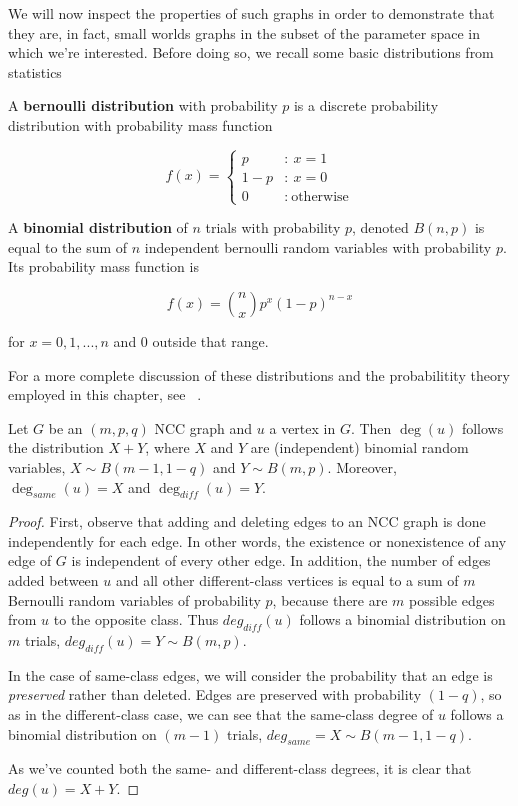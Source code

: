 We will now inspect the properties of such graphs in order to demonstrate that they are, in fact,
small worlds graphs in the subset of the parameter space in which we're interested. Before doing so,
we recall some basic distributions from statistics

\begin{definition}
  A \textbf{bernoulli distribution} with probability $p$ is a discrete probability distribution
  with probability mass function

  \[
    f(x) =
      \begin{cases}
        p &:~ x = 1 \\
        1-p &:~ x = 0 \\
        0 &:~ \text{otherwise}
      \end{cases}
    \]

  A \textbf{binomial distribution} of $n$ trials with probability $p$, denoted $B(n,p)$ is equal to
  the sum of $n$ independent bernoulli random variables with probability $p$. Its probability mass
  function is

  \[
    f(x) = {n \choose x} p^x(1-p)^{n-x}
  \]

  for $x = 0,1,...,n$ and $0$ outside that range.

  For a more complete discussion of these distributions and the probabilitity theory employed in
  this chapter, see ~\cite{CaseBerg:01}.
\end{definition}


\begin{theorem}
  \label{thm:ncc_deg}
  Let $G$ be an $(m,p,q)$ NCC graph and $u$ a vertex in $G$. Then $\deg(u)$ follows the distribution
  $X + Y$, where $X$ and $Y$ are (independent) binomial random variables, $X \sim B(m-1,1-q)$ and
  $Y \sim B(m,p)$. Moreover, $\deg_{same}(u) = X$ and $\deg_{diff}(u) = Y$.
\end{theorem}
\begin{proof}
  First, observe that adding and deleting edges to an NCC graph is done independently for each edge.
  In other words, the existence or nonexistence of any edge of $G$ is independent of every other edge.
  In addition, the number of edges added between $u$ and all other different-class vertices is equal
  to a sum of $m$ Bernoulli random variables of probability $p$, because there are $m$ possible edges
  from $u$ to the opposite class. Thus $deg_{diff}(u)$ follows a binomial distribution on $m$ trials,
  $deg_{diff}(u) = Y \sim B(m,p)$.

  In the case of same-class edges, we will consider the probability that an edge is \textit{preserved}
  rather than deleted. Edges are preserved with probability $(1-q)$, so as in the different-class
  case, we can see that the same-class degree of $u$ follows a binomial distribution on $(m-1)$
  trials, $deg_{same} = X \sim B(m-1,1-q)$.

  As we've counted both the same- and different-class degrees, it is clear that $deg(u) = X + Y$.
\end{proof}

